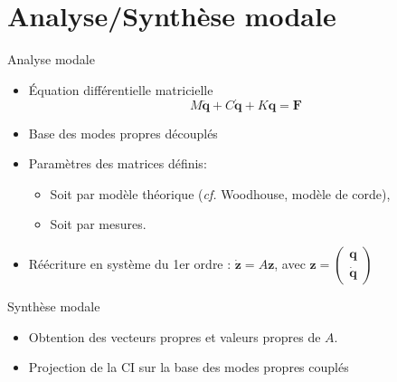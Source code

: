 \section{Analyse/Synthèse modale}

\begin{frame}{Analyse modale}
 \begin{itemize}
  \item Équation différentielle matricielle
    \[ M \ddot{\bm{q}} + C \dot{\bm{q}} + K \bm{q} = \bm{F} \]
  \item Base des modes propres découplés
  \item Paramètres des matrices définis:
    \begin{itemize}
     \item Soit par modèle théorique (\emph{cf.} Woodhouse, modèle de corde),
     \item Soit par mesures.
    \end{itemize}
  \item Réécriture en système du 1er ordre : \( \dot{\bm{z}} = A\bm{z} \), avec
    \( \bm{z} = \begin{pmatrix}
                 \bm{q} \\
		 \dot{\bm{q}}
                \end{pmatrix} \)
 \end{itemize}
\end{frame}

\begin{frame}{Synthèse modale}
 \begin{itemize}
  \item Obtention des vecteurs propres et valeurs propres de \( A \).
  \item Projection de la CI sur la base des modes propres couplés
 \end{itemize}
\end{frame}
